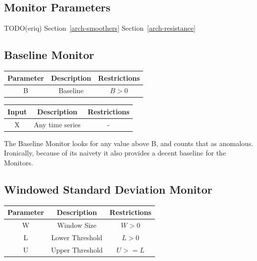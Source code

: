 \documentclass[12pt]{ucthesis}
\begin{document}
\subsection{Monitor Parameters}
\label{outage-detection-monitors-params}
TODO(eriq)
Section~\ref{arch-smoothers}
Section~\ref{arch-resistance}

\subsection{Baseline Monitor}
\label{outage-detection-monitors-Baseline}
\begin{table}[H]
   \begin{center}
      \begin{tabular}{|c|c|c|}
         \hline
            Parameter & Description & Restrictions \\
         \hline
            B & Baseline & $ B > 0 $\\
         \hline
      \end{tabular}
   \end{center}
\end{table}

\begin{table}[H]
   \begin{center}
      \begin{tabular}{|c|c|c|}
         \hline
            Input & Description & Restrictions \\
         \hline
            X & Any time series & - \\
         \hline
      \end{tabular}
   \end{center}
\end{table}

The Baseline Monitor looks for any value above B, and counts that as anomalous.
Ironically, because of its naivety it also provides a decent baseline for the Monitors.

\subsection{Windowed Standard Deviation Monitor}
\label{outage-detection-monitors-WindowStdDev}
\begin{table}[H]
   \begin{center}
      \begin{tabular}{|c|c|c|}
         \hline
            Parameter & Description & Restrictions \\
         \hline
            W & Window Size & $ W > 0 $\\
         \hline
            L & Lower Threshold & $L > 0 $\\
         \hline
            U & Upper Threshold & $U >= L $\\
         \hline
      \end{tabular}
   \end{center}
\end{table}
\end{document}
